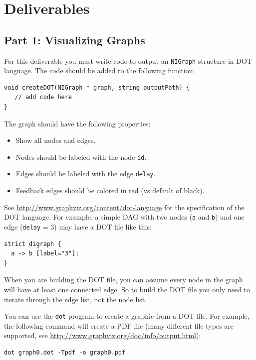 \section{Deliverables}

\subsection{Part 1: Visualizing Graphs}
\label{sec:del1}

For this deliverable you must write code to output an {\tt NIGraph} structure in DOT language.  The code should be added to the following function:

\begin{lstlisting}
void createDOT(NIGraph * graph, string outputPath) {
   // add code here
}
\end{lstlisting}

The graph should have the following properties:
\begin{itemize}
	\item Show all nodes and edges.
	\item Nodes should be labeled with the node {\tt id}.
	\item Edges should be labeled with the edge {\tt delay}.
	\item Feedback edges should be colored in red (vs default of black).
\end{itemize}

See \url{http://www.graphviz.org/content/dot-language} for the specification of the DOT language.  For example, a simple DAG with two nodes ({\tt a} and {\tt b}) and one edge ({\tt delay} = 3) may have a DOT file like this:

\begin{lstlisting}
strict digraph {
  a -> b [label="3"];
}
\end{lstlisting}
When you are building the DOT file, you can assume every node in the graph will have at least one connected edge.  So to build the DOT file you only need to iterate through the edge list, not the node list.


You can use the {\tt dot} program to create a graphic from a DOT file.  For example, the following command will create a PDF file (many different file types are supported, see \url{http://www.graphviz.org/doc/info/output.html}):
\begin{lstlisting}
dot graph0.dot -Tpdf -o graph0.pdf
\end{lstlisting}

